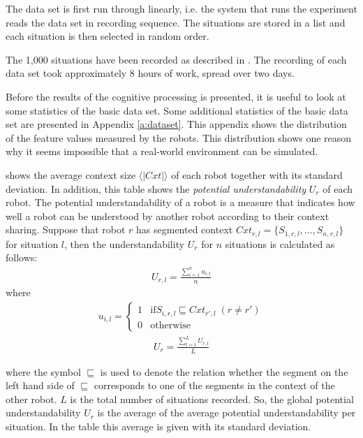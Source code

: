 The data set is first run through linearly, i.e. the system that runs
the experiment reads the data set in recording sequence. 
The situations are stored in a list and each situation is then selected in
random order.


The 1,000 situations have been recorded as described in . The recording of each data set took approximately 8 hours of work,
spread over two days.



Before the results of the cognitive processing is presented, it is useful to look at some statistics of the basic data set. Some additional statistics of the basic data set are presented in Appendix \ref{a:dataset}. This appendix shows the distribution of the feature values measured by the robots. This distribution shows one reason why it seems impossible that a real-world environment can be simulated.

 shows the average context size $\langle |Cxt| \rangle$ of each robot together with its standard deviation. In addition, this table shows the {\em potential understandability} $U_r$ of each robot. The potential understandability of a robot is a measure that indicates how well a robot can be understood by another robot according to their context sharing. Suppose that robot $r$ has segmented context $Cxt_{r,l}=\{S_{1,r,l},\ldots,S_{n,r,l}\}$ for situation $l$, then the understandability $U_r$ for $n$ situations is calculated as follows:
\begin{eqnarray}
U_{r,l}=\frac{\sum_{i=1}^n u_{i,l}}{n}
\end{eqnarray}
where
\begin{eqnarray}
u_{i,l} = \left \{ \begin{array}{rl}
1 & \mbox{if} S_{i,r,l} \sqsubseteq Cxt_{r',l} \; (r \neq r')\\
0 & \mbox{otherwise}
\end{array} \right.
\end{eqnarray}
\begin{eqnarray}
U_r = \frac{\sum_{l=1}^L U_{r,l}}{L}
\end{eqnarray}


where the symbol $\sqsubseteq$ is used to denote the relation whether the segment on the left hand side of $\sqsubseteq$ corresponds to one of the segments in the context of the other robot. $L$ is the total number of situations recorded. So, the global potential understandability $U_r$ is the average of the average potential understandability per situation. In the table this average is given with its standard deviation.

